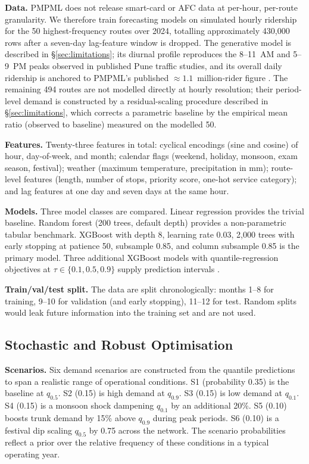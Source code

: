 \documentclass[a4paper,twoside]{article}
\begin{document}
\textbf{Data.} PMPML does not release smart-card or AFC data at
per-hour, per-route granularity. We therefore train forecasting
models on simulated hourly ridership for the 50 highest-frequency
routes over 2024, totalling approximately 430{,}000 rows after a
seven-day lag-feature window is dropped. The generative model is
described in \S\ref{sec:limitations}; its diurnal profile
reproduces the 8--11~AM and 5--9~PM peaks observed in published
Pune traffic studies, and its overall daily ridership is anchored
to PMPML's published $\approx 1.1$~million-rider figure
\cite{itdp2024pmpml}. The remaining 494 routes are not modelled
directly at hourly resolution; their period-level demand is
constructed by a residual-scaling procedure described in
\S\ref{sec:limitations}, which corrects a parametric baseline by
the empirical mean ratio (observed to baseline) measured on the
modelled 50.

\textbf{Features.} Twenty-three features in total: cyclical
encodings (sine and cosine) of hour, day-of-week, and month;
calendar flags (weekend, holiday, monsoon, exam season,
festival); weather (maximum temperature, precipitation in mm);
route-level features (length, number of stops, priority score,
one-hot service category); and lag features at one day and seven
days at the same hour.

\textbf{Models.} Three model classes are compared. Linear
regression provides the trivial baseline. Random forest (200
trees, default depth) provides a non-parametric tabular benchmark.
XGBoost \cite{chen2016xgboost} with depth 8, learning rate 0.03,
2{,}000 trees with early stopping at patience 50, subsample 0.85,
and column subsample 0.85 is the primary model. Three additional
XGBoost models with quantile-regression objectives at
$\tau \in \{0.1, 0.5, 0.9\}$ supply prediction intervals
\cite{koenker1978regression}.

\textbf{Train/val/test split.} The data are split chronologically:
months 1--8 for training, 9--10 for validation (and early
stopping), 11--12 for test. Random splits would leak future
information into the training set and are not used.

\subsection{Stochastic and Robust Optimisation}
\label{sec:stoch}

\textbf{Scenarios.} Six demand scenarios are constructed from the
quantile predictions to span a realistic range of operational
conditions. S1 (probability 0.35) is the baseline at $q_{0.5}$.
S2 (0.15) is high demand at $q_{0.9}$. S3 (0.15) is low demand at
$q_{0.1}$. S4 (0.15) is a monsoon shock dampening $q_{0.1}$ by an
additional 20\%. S5 (0.10) boosts trunk demand by 15\% above
$q_{0.9}$ during peak periods. S6 (0.10) is a festival dip
scaling $q_{0.5}$ by 0.75 across the network. The scenario
probabilities reflect a prior over the relative frequency of
these conditions in a typical operating year.
\end{document}
